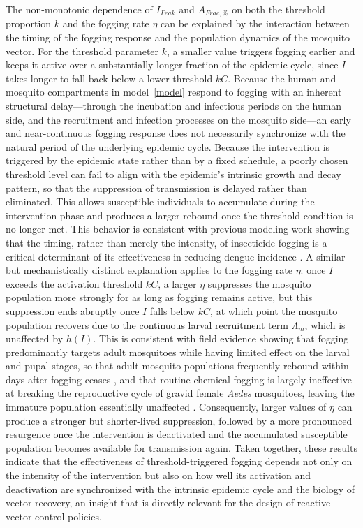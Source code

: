 \documentclass[preprint]{elsarticle}
\begin{document}
The non-monotonic dependence of $I_{Peak}$ and $A_{Frac,\%}$ on both the threshold proportion $k$ and the fogging rate $\eta$ can be explained by the interaction between the timing of the fogging response and the population dynamics of the mosquito vector. For the threshold parameter $k$, a smaller value triggers fogging earlier and keeps it active over a substantially longer fraction of the epidemic cycle, since $I$ takes longer to fall back below a lower threshold $kC$. Because the human and mosquito compartments in model~\eqref{model} respond to fogging with an inherent structural delay---through the incubation and infectious periods on the human side, and the recruitment and infection processes on the mosquito side---an early and near-continuous fogging response does not necessarily synchronize with the natural period of the underlying epidemic cycle. Because the intervention is triggered by the epidemic state rather than by a fixed schedule, a poorly chosen threshold level can fail to align with the epidemic's intrinsic growth and decay pattern, so that the suppression of transmission is delayed rather than eliminated. This allows susceptible individuals to accumulate during the intervention phase and produces a larger rebound once the threshold condition is no longer met. This behavior is consistent with previous modeling work showing that the timing, rather than merely the intensity, of insecticide fogging is a critical determinant of its effectiveness in reducing dengue incidence \cite{oki2011optimal}. A similar but mechanistically distinct explanation applies to the fogging rate $\eta$: once $I$ exceeds the activation threshold $kC$, a larger $\eta$ suppresses the mosquito population more strongly for as long as fogging remains active, but this suppression ends abruptly once $I$ falls below $kC$, at which point the mosquito population recovers due to the continuous larval recruitment term $\Lambda_m$, which is unaffected by $h(I)$. This is consistent with field evidence showing that fogging predominantly targets adult mosquitoes while having limited effect on the larval and pupal stages, so that adult mosquito populations frequently rebound within days after fogging ceases \cite{mani2005efficacy}, and that routine chemical fogging is largely ineffective at breaking the reproductive cycle of gravid female \textit{Aedes} mosquitoes, leaving the immature population essentially unaffected \cite{chua2005effect}. Consequently, larger values of $\eta$ can produce a stronger but shorter-lived suppression, followed by a more pronounced resurgence once the intervention is deactivated and the accumulated susceptible population becomes available for transmission again. Taken together, these results indicate that the effectiveness of threshold-triggered fogging depends not only on the intensity of the intervention but also on how well its activation and deactivation are synchronized with the intrinsic epidemic cycle and the biology of vector recovery, an insight that is directly relevant for the design of reactive vector-control policies.
\end{document}
